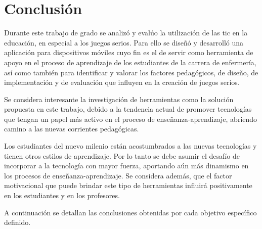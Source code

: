 \chapter{Conclusión}
\label{chap:conclusion}


Durante este trabajo de grado se analizó y evalúo la utilización de las
\Gls{tic} en la educación, en especial a los juegos serios. Para ello se diseñó
y desarrolló una aplicación para dispositivos móviles cuyo fin es el de servir
como herramienta de apoyo en el proceso de aprendizaje de los estudiantes de la
carrera de enfermería, así como también para identificar y valorar los factores
pedagógicos, de diseño, de implementación y de evaluación que influyen en la
creación de juegos serios.

Se considera interesante la investigación de herramientas como la solución
propuesta en este trabajo, debido a la tendencia actual de promover tecnologías
que tengan un papel más activo en el proceso de enseñanza-aprendizaje, abriendo
camino a las nuevas corrientes pedagógicas. 

Los estudiantes del nuevo milenio están acostumbrados a las nuevas tecnologías y
tienen otros estilos de aprendizaje. Por lo tanto se debe asumir el desafío de
incorporar a la tecnología con mayor fuerza, aportando aún más dinamismo en los
procesos de enseñanza-aprendizaje. Se considera además, que el factor
motivacional que puede brindar este tipo de herramientas influirá positivamente
en los estudiantes y en los profesores.

A continuación se detallan las conclusiones obtenidas por cada objetivo
específico definido.



